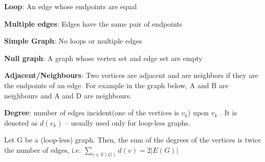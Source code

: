\documentclass{article}
\theoremstyle{definition}
\theoremstyle{definition}
\newenvironment{manualprop}[1]{%
  \renewcommand\themanualpropinner{#1}%
  \manualpropinner
}{\endmanualpropinner}
\theoremstyle{named}
\begin{document}
\begin{citemize}
    \item \textbf{{Loop}}: An edge whose endpoints are equal
    
    \item \textbf{{Multiple edges}}: Edges have the same pair of endpoints
    
    \item \textbf{{Simple Graph}}: No loops or multiple edges

    \item \textbf{{Null graph}}: A graph whose vertex set and edge set are empty

    \item  \textbf{{Adjacent/Neighbours}}: Two vertices are adjacent and are neighbors if they are the endpoints of an edge. For example in the graph below, A and B are neighbours and A and D are neighbours.

    \item \textbf{Degree}: number of edges
incident(one of the vertices is $v_k$) upon $v_k$ . It is denoted as $d(v_k)$ –
usually used only for loop-less graphs.

\end{citemize}

\begin{manualprop}{30}
    Let G be a (loop-less) graph. Then, the
sum of the degrees of the vertices is twice the number of
edges, i.e. $\sum_{v \in V(G)}^{} d(v) = 2 |E(G)|$
\end{manualprop}
\end{document}
